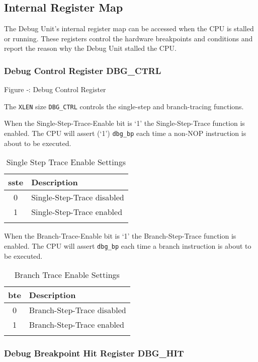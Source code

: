 \subsection{Internal Register Map}\label{internal-register-map}

The Debug Unit's internal register map can be accessed when the CPU is
stalled or running. These registers control the hardware breakpoints and
conditions and report the reason why the Debug Unit stalled the CPU.

\subsubsection{Debug Control Register
DBG\_CTRL}\label{debug-control-register-dbg_ctrl}

\missingfigure{}

Figure ‑: Debug Control Register

The \texttt{XLEN} size \texttt{DBG\_CTRL} controls the single-step and branch-tracing
functions.

When the Single-Step-Trace-Enable bit is `1' the Single-Step-Trace
function is enabled. The CPU will assert (`1') \texttt{dbg\_bp} each time a
non-NOP instruction is about to be executed.

\begin{longtable}[]{@{}cl@{}}
\toprule
\textbf{sste} & \textbf{Description}\tabularnewline
\midrule
\endhead
0 & Single-Step-Trace disabled\tabularnewline
1 & Single-Step-Trace enabled\tabularnewline
\bottomrule
\caption{Single Step Trace Enable Settings}
\label{tab:single-step-trace-settings}
\end{longtable}

When the Branch-Trace-Enable bit is `1' the Branch-Step-Trace function
is enabled. The CPU will assert \texttt{dbg\_bp} each time a branch instruction
is about to be executed.

\begin{longtable}[]{@{}cl@{}}
\toprule
\textbf{bte} & \textbf{Description}\tabularnewline
\midrule
\endhead
0 & Branch-Step-Trace disabled\tabularnewline
1 & Branch-Step-Trace enabled\tabularnewline
\bottomrule
\caption{Branch Trace Enable Settings}
\label{tab:branch-trace-settings}
\end{longtable}


\subsubsection{Debug Breakpoint Hit Register
DBG\_HIT}\label{debug-breakpoint-hit-register-dbg_hit}

